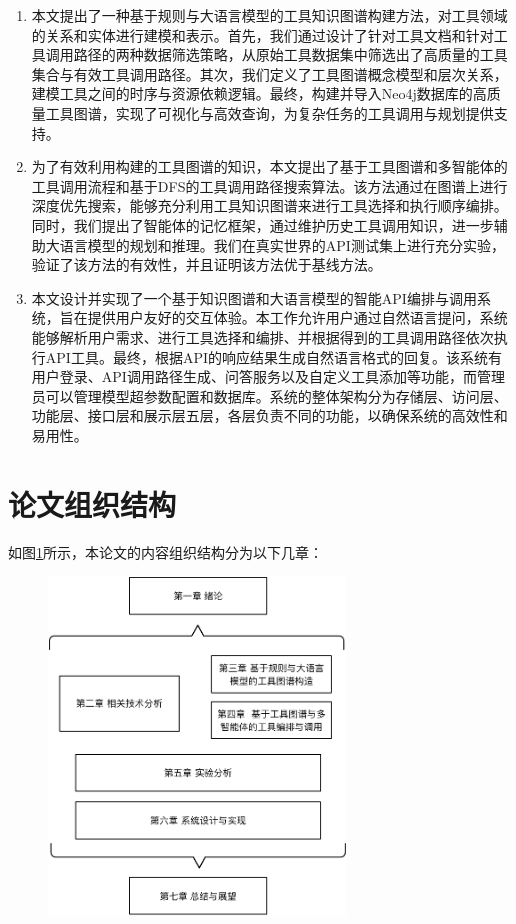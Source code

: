 \begin{enumerate}
    \item 本文提出了一种基于规则与大语言模型的工具知识图谱构建方法，对工具领域的关系和实体进行建模和表示。首先，我们通过设计了针对工具文档和针对工具调用路径的两种数据筛选策略，从原始工具数据集中筛选出了高质量的工具集合与有效工具调用路径。其次，我们定义了工具图谱概念模型和层次关系，建模工具之间的时序与资源依赖逻辑。最终，构建并导入Neo4j数据库的高质量工具图谱，实现了可视化与高效查询，为复杂任务的工具调用与规划提供支持。
    \item 为了有效利用构建的工具图谱的知识，本文提出了基于工具图谱和多智能体的工具调用流程和基于DFS的工具调用路径搜索算法。该方法通过在图谱上进行深度优先搜索，能够充分利用工具知识图谱来进行工具选择和执行顺序编排。同时，我们提出了智能体的记忆框架，通过维护历史工具调用知识，进一步辅助大语言模型的规划和推理。我们在真实世界的API测试集上进行充分实验，验证了该方法的有效性，并且证明该方法优于基线方法。
    \item 本文设计并实现了一个基于知识图谱和大语言模型的智能API编排与调用系统，旨在提供用户友好的交互体验。本工作允许用户通过自然语言提问，系统能够解析用户需求、进行工具选择和编排、并根据得到的工具调用路径依次执行API工具。最终，根据API的响应结果生成自然语言格式的回复。该系统有用户登录、API调用路径生成、问答服务以及自定义工具添加等功能，而管理员可以管理模型超参数配置和数据库。系统的整体架构分为存储层、访问层、功能层、接口层和展示层五层，各层负责不同的功能，以确保系统的高效性和易用性。
\end{enumerate}

\section{论文组织结构}

如图\ref{fig:ch1-structure}所示，本论文的内容组织结构分为以下几章：

\begin{figure}[!htp]
    \vspace{1em}
    \centering
    \setlength{\abovecaptionskip}{10pt} %
    \includegraphics[height=9cm]{../assets/ch1-论文结构.pdf}
    \label{fig:ch1-structure}
  \end{figure}

